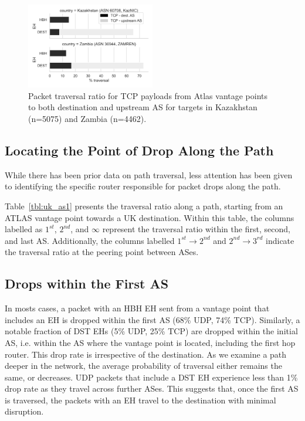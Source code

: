 \documentclass[conference]{IEEEtran}
\begin{document}

\begin{figure}
\centering
  \includegraphics[width=0.5\textwidth]{traversal-pathologies.png}
  \caption{Packet traversal ratio for TCP payloads from Atlas vantage points to both destination and upstream
AS for targets in Kazakhstan (n=5075) and Zambia (n=4462).}
  \label{fig:traversal_pathologies}
\end{figure}

\subsection{Locating the Point of Drop Along the Path}

While there has been prior data on path traversal, less attention has been
given to identifying the specific router responsible for packet drops along the
path.

Table~\ref{tbl:uk_as1} presents the traversal ratio along a
path, starting from an ATLAS vantage point towards a UK destination.
Within this table, the columns labelled as $1^{st}$, $2^{nd}$, and $\infty$
represent the traversal ratio within the first, second, and last AS.
Additionally, the columns labelled $1^{st}\rightarrow 2^{nd}$ and
$2^{nd}\rightarrow 3^{rd}$ indicate the traversal ratio at the peering point
between ASes.

\subsection{Drops within the First AS}

In mosts cases, a packet with an HBH EH sent from a vantage point that
includes an EH is dropped within the first AS  (68\% UDP, 74\% TCP).
Similarly, a notable fraction of DST EHs (5\% UDP, 25\% TCP) are dropped within the
initial AS, i.e.  within the AS where the vantage point is located, including
the first hop router. This drop rate is irrespective of the destination.
As we examine a path deeper in the network, the average probability of traversal
either remains the same, or decreases. 
UDP packets that include a DST EH
experience less than 1\% drop rate as they travel across further ASes.  This
suggests that, once the first AS is traversed, the packets with an EH travel to the
destination with minimal disruption.
\end{document}
